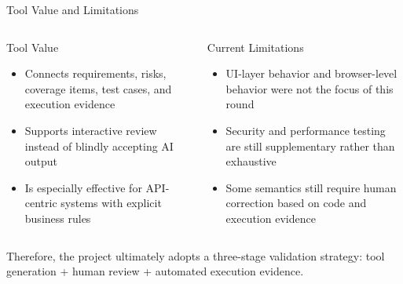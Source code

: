 \begin{frame}{Tool Value and Limitations}
    \small
    \begin{columns}[T]
        \begin{block}{Tool Value}
            \begin{itemize}
                \item Connects requirements, risks, coverage items, test cases, and execution evidence
                \item Supports interactive review instead of blindly accepting AI output
                \item Is especially effective for API-centric systems with explicit business rules
            \end{itemize}
        \end{block}

        \begin{block}{Current Limitations}
            \begin{itemize}
                \item UI-layer behavior and browser-level behavior were not the focus of this round
                \item Security and performance testing are still supplementary rather than exhaustive
                \item Some semantics still require human correction based on code and execution evidence
            \end{itemize}
        \end{block}
    \end{columns}

    \vspace{0.5em}
    \footnotesize
    Therefore, the project ultimately adopts a three-stage validation strategy: tool generation + human review + automated execution evidence.
\end{frame}
